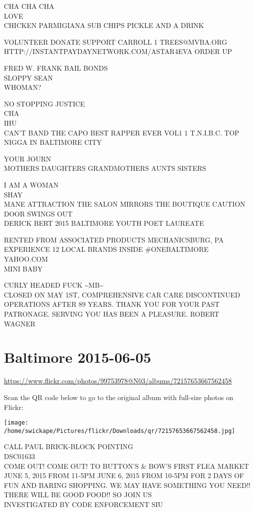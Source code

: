 \documentclass[10pt,letterpaper]{article}
\begin{document}
CHA CHA CHA\\
LOVE\\
CHICKEN PARMIGIANA SUB CHIPS PICKLE AND A DRINK

VOLUNTEER DONATE SUPPORT CARROLL 1 TREES@MVBA.ORG\\
HTTP://INSTANTPAYDAYNETWORK.COM/ASTAR4EVA ORDER UP

FRED W. FRANK BAIL BONDS\\
SLOPPY SEAN\\
WHOMAN?

NO STOPPING JUSTICE\\
CHA\\
IHU\\
CAN'T BAND THE CAPO BEST RAPPER EVER VOL1 1 T.N.I.B.C. TOP NIGGA IN BALTIMORE CITY

YOUR JOURN\\
MOTHERS DAUGHTERS GRANDMOTHERS AUNTS SISTERS

I AM A WOMAN\\
SHAY\\
MANE ATTRACTION THE SALON MIRRORS THE BOUTIQUE CAUTION DOOR SWINGS OUT\\
DERICK BERT 2015 BALTIMORE YOUTH POET LAUREATE

RENTED FROM ASSOCIATED PRODUCTS MECHANICSBURG, PA\\
EXPERIENCE 12 LOCAL BRANDS INSIDE \#ONEBALTIMORE\\
YAHOO.COM\\
MINI BABY

CURLY HEADED FUCK \textasciitilde{}MB\textasciitilde{}\\
CLOSED ON MAY 1ST, COMPREHENSIVE CAR CARE DISCONTINUED OPERATIONS AFTER 89 YEARS.  THANK YOU FOR YOUR PAST PATRONAGE.  SERVING YOU HAS BEEN A PLEASURE.  ROBERT WAGNER
\pagebreak

\section*{Baltimore 2015-06-05}

\url{https://www.flickr.com/photos/99753978@N03/albums/72157653667562458}

Scan the QR code below to go to the original album with full-size photos on Flickr:

\texttt{[image: /home/swickape/Pictures/flickr/Downloads/qr/72157653667562458.jpg]}
\pagebreak

CALL PAUL BRICK{-}BLOCK POINTING\\
DSC01633\\
COME OUT!  COME OUT!  TO BUTTON'S \& BOW'S FIRST FLEA MARKET JUNE 5, 2015 FROM 11{-}5PM JUNE 6, 2015 FROM 10{-}5PM FOR 2 DAYS OF FUN AND BARING SHOPPING.  WE MAY HAVE SOMETHING YOU NEED!! THERE WILL BE GOOD FOOD!! SO JOIN US\\
INVESTIGATED BY CODE ENFORCEMENT SIU
\end{document}
